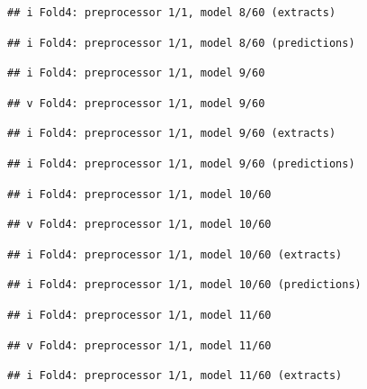 \documentclass[
]{article}
\begin{document}
\begin{verbatim}
## i Fold4: preprocessor 1/1, model 8/60 (extracts)
\end{verbatim}

\begin{verbatim}
## i Fold4: preprocessor 1/1, model 8/60 (predictions)
\end{verbatim}

\begin{verbatim}
## i Fold4: preprocessor 1/1, model 9/60
\end{verbatim}

\begin{verbatim}
## v Fold4: preprocessor 1/1, model 9/60
\end{verbatim}

\begin{verbatim}
## i Fold4: preprocessor 1/1, model 9/60 (extracts)
\end{verbatim}

\begin{verbatim}
## i Fold4: preprocessor 1/1, model 9/60 (predictions)
\end{verbatim}

\begin{verbatim}
## i Fold4: preprocessor 1/1, model 10/60
\end{verbatim}

\begin{verbatim}
## v Fold4: preprocessor 1/1, model 10/60
\end{verbatim}

\begin{verbatim}
## i Fold4: preprocessor 1/1, model 10/60 (extracts)
\end{verbatim}

\begin{verbatim}
## i Fold4: preprocessor 1/1, model 10/60 (predictions)
\end{verbatim}

\begin{verbatim}
## i Fold4: preprocessor 1/1, model 11/60
\end{verbatim}

\begin{verbatim}
## v Fold4: preprocessor 1/1, model 11/60
\end{verbatim}

\begin{verbatim}
## i Fold4: preprocessor 1/1, model 11/60 (extracts)
\end{verbatim}
\end{document}
